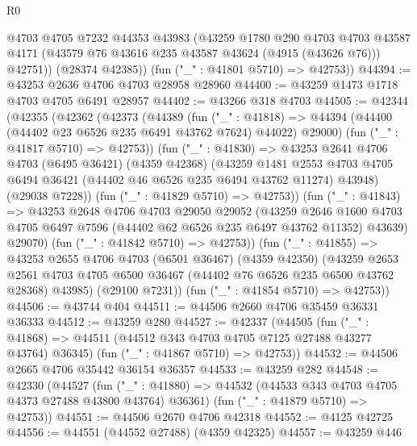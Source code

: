 \begin{lexlean}{R0}
\begin{coremodule}
          @4703
          @4705
          @7232
          @44353
          @43983
          (@43259
            @1780
            @290
            @4703
            @4703
            @43587
            @4171
            (@43579 @76 @43616 @235 @43587 @43624 (@4915 (@43626 @76)))
            @42751))
        (@28374 @42385))
      (fun ("_" : @41801 @5710) => @42753))
@44394 := @43253 @2636 @4706 @4703 @28958 @28960
@44400 := @43259 @1473 @1718 @4703 @4705 @6491 @28957
@44402 := @43266 @318 @4703
@44505 := @42344
    (@42355
      (@42362
        (@42373
          (@44389
            (fun ("_" : @41818) =>
            @44394 (@44400 (@44402 @23 @6526 @235 @6491 @43762 @7624) @44022) @29000)
            (fun ("_" : @41817 @5710) => @42753))
          (fun ("_" : @41830) =>
          @43253
            @2641
            @4706
            @4703
            (@6495 @36421)
            (@4359 @42368)
            (@43259
              @1481
              @2553
              @4703
              @4705
              @6494
              @36421
              (@44402 @46 @6526 @235 @6494 @43762 @11274)
              @43948)
            (@29038 @7228))
          (fun ("_" : @41829 @5710) => @42753))
        (fun ("_" : @41843) =>
        @43253
          @2648
          @4706
          @4703
          @29050
          @29052
          (@43259
            @2646
            @1600
            @4703
            @4705
            @6497
            @7596
            (@44402 @62 @6526 @235 @6497 @43762 @11352)
            @43639)
          @29070)
        (fun ("_" : @41842 @5710) => @42753))
      (fun ("_" : @41855) =>
      @43253
        @2655
        @4706
        @4703
        (@6501 @36467)
        (@4359 @42350)
        (@43259
          @2653
          @2561
          @4703
          @4705
          @6500
          @36467
          (@44402 @76 @6526 @235 @6500 @43762 @28368)
          @43985)
        (@29100 @7231))
      (fun ("_" : @41854 @5710) => @42753))
@44506 := @43744 @404
@44511 := @44506 @2660 @4706 @35459 @36331 @36333
@44512 := @43259 @280
@44527 := @42337
    (@44505
      (fun ("_" : @41868) => @44511 (@44512 @343 @4703 @4705 @7125 @27488 @43277 @43764) @36345)
      (fun ("_" : @41867 @5710) => @42753))
@44532 := @44506 @2665 @4706 @35442 @36154 @36357
@44533 := @43259 @282
@44548 := @42330
    (@44527
      (fun ("_" : @41880) => @44532 (@44533 @343 @4703 @4705 @4373 @27488 @43800 @43764) @36361)
      (fun ("_" : @41879 @5710) => @42753))
@44551 := @44506 @2670 @4706 @42318
@44552 := @4125 @42725
@44556 := @44551 (@44552 @27488) (@4359 @42325)
@44557 := @43259 @446

\end{coremodule}
\end{lexlean}
